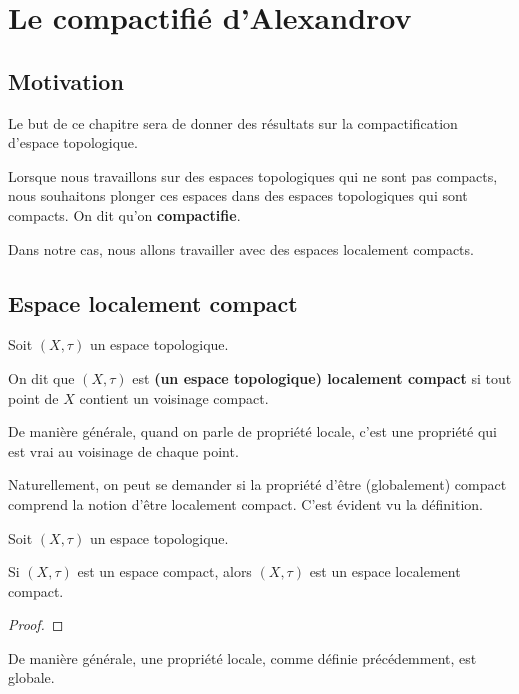 \chapter{Le compactifié d'Alexandrov}

\section*{Motivation}

Le but de ce chapitre sera de donner des résultats sur la compactification
d'espace topologique.

Lorsque nous travaillons sur des espaces topologiques qui ne sont pas compacts,
nous souhaitons plonger ces espaces dans des espaces topologiques qui
sont compacts. On dit qu'on \textbf{compactifie}.

Dans notre cas, nous allons travailler avec des espaces localement compacts.

\section{Espace localement compact}

\begin{definition}
	Soit $(X, \tau)$ un espace topologique.

	On dit que $(X, \tau)$ est \textbf{(un espace topologique) localement
	compact} si tout point de $X$ contient un voisinage compact.
\end{definition}

\begin{remarque}
	De manière générale, quand on parle de propriété locale, c'est une propriété
	qui est vrai au voisinage de chaque point.
\end{remarque}

Naturellement, on peut se demander si la propriété d'être (globalement) compact comprend la
notion d'être localement compact. C'est évident vu la définition.

\begin{proposition}
	Soit $(X, \tau)$ un espace topologique.

	Si $(X, \tau)$ est un espace compact, alors $(X, \tau)$ est un espace
	localement compact.
\end{proposition}

\ifdefined\outputproof
\begin{proof}

\end{proof}
\fi

\begin{remarque}
	De manière générale, une propriété locale, comme définie précédemment, est
	globale.
\end{remarque}

